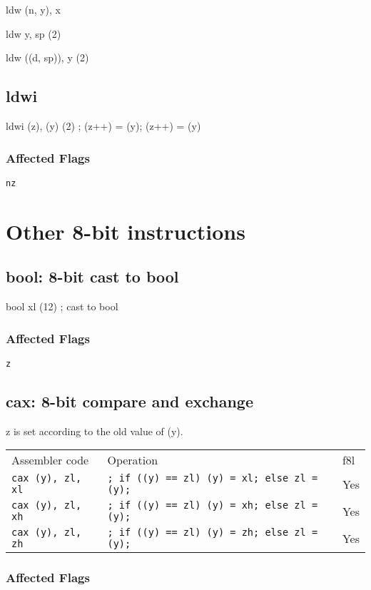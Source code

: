 \documentclass{book}
\begin{document}
ldw (n, y), x

ldw y, sp (2)

ldw ((d, sp)), y (2)


\subsection{ldwi}

ldwi (z), (y) (2) ; (z++) = (y); (z++) = (y)

\subsubsection*{Affected Flags}

\texttt{nz}


\section{Other 8-bit instructions}

\subsection{bool: 8-bit cast to bool}

bool xl (12) ; cast to bool

\subsubsection*{Affected Flags}

\texttt{z}


\subsection{cax: 8-bit compare and exchange}

z is set according to the old value of (y).

\begin{tabular}{l l l}
Assembler code            & Operation                                          & f8l \\
\texttt{cax (y), zl, xl}  & \texttt{; if ((y) == zl) (y) = xl; else zl = (y);} & Yes \\
\texttt{cax (y), zl, xh}  & \texttt{; if ((y) == zl) (y) = xh; else zl = (y);} & Yes \\
\texttt{cax (y), zl, zh}  & \texttt{; if ((y) == zl) (y) = zh; else zl = (y);} & Yes
\end{tabular}

\subsubsection*{Affected Flags}
\end{document}
